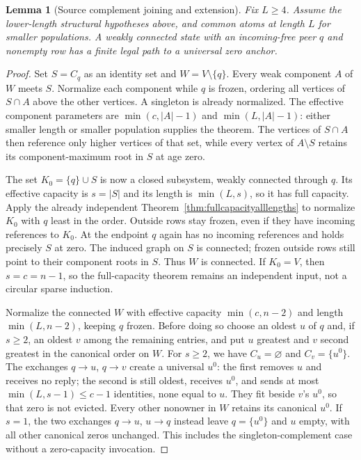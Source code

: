 \documentclass[11pt]{article}
\newtheorem{lemma}[theorem]{Lemma}
\begin{document}
\begin{lemma}[Source complement joining and extension]
\label{lem:generalsourceextension}
Fix $L\ge4$. Assume the lower-length structural hypotheses above,
and common atoms at length $L$ for smaller populations. A weakly
connected state with an incoming-free peer $q$ and nonempty row
has a finite legal path to a universal zero anchor.
\end{lemma}
\begin{proof}
Set $S=C_q$ as an identity set and $W=V\setminus\{q\}$.
Every weak component $A$ of $W$ meets $S$. Normalize each component
while $q$ is frozen, ordering all vertices of $S\cap A$ above the
other vertices. A singleton is already normalized. The effective
component parameters are $\min(c,|A|-1)$ and $\min(L,|A|-1)$:
either smaller length or smaller population supplies the theorem.
The vertices of $S\cap A$ then reference only higher vertices of
that set, while every vertex of $A\setminus S$ retains its
component-maximum root in $S$ at age zero.

The set $K_0=\{q\}\cup S$ is now a closed subsystem, weakly
connected through $q$. Its effective capacity is $s=|S|$ and its
length is $\min(L,s)$, so it has full capacity. Apply the already
independent Theorem~\ref{thm:fullcapacityalllengths} to normalize
$K_0$ with $q$ least in the order. Outside rows stay frozen, even
if they have incoming references to $K_0$. At the endpoint $q$
again has no incoming references and holds precisely $S$ at zero.
The induced graph on $S$ is connected; frozen outside rows still
point to their component roots in $S$. Thus $W$ is connected.
If $K_0=V$, then $s=c=n-1$, so the full-capacity theorem remains
an independent input, not a circular sparse induction.

Normalize the connected $W$ with effective capacity $\min(c,n-2)$
and length $\min(L,n-2)$, keeping $q$ frozen. Before doing so choose
an oldest $u$ of $q$ and, if $s\ge2$, an oldest $v$ among the
remaining entries, and put $u$ greatest and $v$ second greatest
in the canonical order on $W$. For $s\ge2$, we have
$C_u=\varnothing$ and $C_v=\{u^0\}$. The exchanges $q\to u$, $q\to v$ create a
universal $u^0$: the first removes $u$ and receives no reply; the
second is still oldest, receives $u^0$, and sends at most
$\min(L,s-1)\le c-1$ identities, none equal to $u$. They fit beside
$v$'s $u^0$, so that zero is not evicted. Every other nonowner in
$W$ retains its canonical $u^0$. If $s=1$, the two exchanges
$q\to u$, $u\to q$ instead leave $q=\{u^0\}$ and $u$ empty,
with all other canonical zeros unchanged. This includes the
singleton-complement case without a zero-capacity invocation.
\end{proof}
\end{document}
